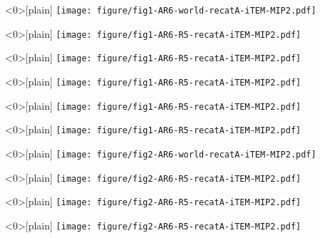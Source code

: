 \documentclass[12pt,aspectratio=169]{beamer}
\begin{document}
\begin{frame}<0>[plain]
  \centering
  \texttt{[image: figure/fig1-AR6-world-recatA-iTEM-MIP2.pdf]}
\end{frame}

\begin{frame}<0>[plain]
  \centering
  \texttt{[image: figure/fig1-AR6-R5-recatA-iTEM-MIP2.pdf]}
\end{frame}

\begin{frame}<0>[plain]
  \centering
  \texttt{[image: figure/fig1-AR6-R5-recatA-iTEM-MIP2.pdf]}
\end{frame}

\begin{frame}<0>[plain]
  \centering
  \texttt{[image: figure/fig1-AR6-R5-recatA-iTEM-MIP2.pdf]}
\end{frame}

\begin{frame}<0>[plain]
  \centering
  \texttt{[image: figure/fig1-AR6-R5-recatA-iTEM-MIP2.pdf]}
\end{frame}

\begin{frame}<0>[plain]
  \centering
  \texttt{[image: figure/fig1-AR6-R5-recatA-iTEM-MIP2.pdf]}
\end{frame}

\begin{frame}<0>[plain]
  \centering
  \texttt{[image: figure/fig2-AR6-world-recatA-iTEM-MIP2.pdf]}
\end{frame}

\begin{frame}<0>[plain]
  \centering
  \texttt{[image: figure/fig2-AR6-R5-recatA-iTEM-MIP2.pdf]}
\end{frame}

\begin{frame}<0>[plain]
  \centering
  \texttt{[image: figure/fig2-AR6-R5-recatA-iTEM-MIP2.pdf]}
\end{frame}

\begin{frame}<0>[plain]
  \centering
  \texttt{[image: figure/fig2-AR6-R5-recatA-iTEM-MIP2.pdf]}
\end{frame}
\end{document}
